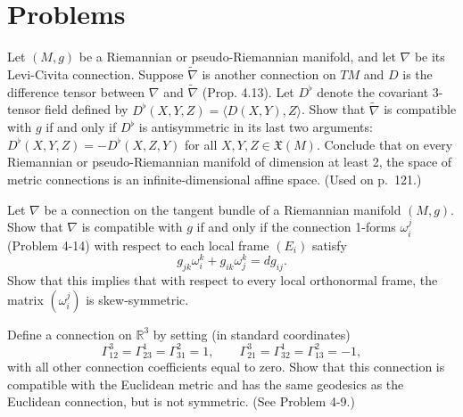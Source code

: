 \section{Problems}

\begin{exercise}
\label{prob:metric-connections-difference-tensor}

Let $(M,g)$ be a Riemannian or pseudo-Riemannian manifold, and let $\nabla$ be its Levi-Civita connection. Suppose $\tilde{\nabla}$ is another connection on $TM$ and $D$ is the difference tensor between $\nabla$ and $\tilde{\nabla}$ (Prop. 4.13). Let $D^\flat$ denote the covariant 3-tensor field defined by $D^\flat(X,Y,Z) = \langle D(X,Y),Z\rangle$. Show that $\tilde{\nabla}$ is compatible with $g$ if and only if $D^\flat$ is antisymmetric in its last two arguments: $D^\flat(X,Y,Z) = -D^\flat(X,Z,Y)$ for all $X,Y,Z \in \mathfrak{X}(M)$. Conclude that on every Riemannian or pseudo-Riemannian manifold of dimension at least 2, the space of metric connections is an infinite-dimensional affine space. (Used on p.\ 121.)
\end{exercise}

\begin{exercise}
\label{prob:connection-forms-compatibility}

Let $\nabla$ be a connection on the tangent bundle of a Riemannian manifold $(M,g)$. Show that $\nabla$ is compatible with $g$ if and only if the connection 1-forms $\omega_i^j$ (Problem 4-14) with respect to each local frame $(E_i)$ satisfy
\[
g_{jk}\omega_i^k + g_{ik}\omega_j^k = dg_{ij}.
\]
Show that this implies that with respect to every local orthonormal frame, the matrix $(\omega_i^j)$ is skew-symmetric.
\end{exercise}

\begin{exercise}
\label{prob:nonsymmetric-euclidean-connection}

Define a connection on $\mathbb{R}^3$ by setting (in standard coordinates)
\[
\Gamma_{12}^3 = \Gamma_{23}^1 = \Gamma_{31}^2 = 1, \qquad
\Gamma_{21}^3 = \Gamma_{32}^1 = \Gamma_{13}^2 = -1,
\]
with all other connection coefficients equal to zero. Show that this connection is compatible with the Euclidean metric and has the same geodesics as the Euclidean connection, but is not symmetric. (See Problem 4-9.)
\end{exercise}

